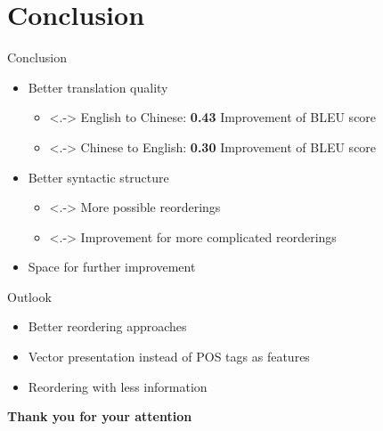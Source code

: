\documentclass[18pt]{beamer}
\begin{document}
\section{Conclusion}
\begin{frame}{Conclusion}
\begin{itemize}[<+->]
\item\alert<1>{Better translation quality}
\begin{itemize}
\item<.-> English to Chinese: \protect\textbf{0.43} Improvement of BLEU score
\item<.-> Chinese to English: \protect\textbf{0.30} Improvement of BLEU score
\end{itemize}
\item\alert<2>{Better syntactic structure}
\begin{itemize}
\item<.-> More possible reorderings
\item<.-> Improvement for more complicated reorderings
\end{itemize}
\item\alert<3>{Space for further improvement}
\end{itemize}
\end{frame}

\begin{frame}{Outlook}
\begin{itemize}[<+-| alert@+>]
\item Better reordering approaches
\item Vector presentation instead of POS tags as features
\item Reordering with less information
\end{itemize}
\end{frame}


\begin{frame}{\vphantom{A}}
\centering
{\LARGE \textbf{Thank you for your attention}}
\end{frame}

\appendix
\beginbackup
\end{document}
